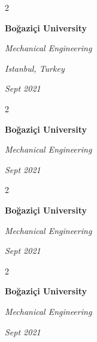 \documentclass[10pt, letterpaper]{article}
\newenvironment{twocolentry}[2][]{
    \onecolentry
    \def\secondColumn{#2}
    \setcolumnwidth{\fill, 4.5 cm}
    \begin{paracol}{2}
}{
    \switchcolumn \raggedleft \secondColumn
    \end{paracol}
    \endonecolentry
} %
\begin{document}
        \vspace{0.2 cm}

        \begin{twocolentry}{
        \textit{Istanbul, Turkey}    
            
        \textit{Sept 2021}}
            \textbf{Boğaziçi University}

            \textit{Mechanical Engineering}
        \end{twocolentry}



        \vspace{0.2 cm}

        \begin{twocolentry}{
            
            
        \textit{Sept 2021}}
            \textbf{Boğaziçi University}

            \textit{Mechanical Engineering}
        \end{twocolentry}



        \vspace{0.2 cm}

        \begin{twocolentry}{
            
            
        \textit{Sept 2021}}
            \textbf{Boğaziçi University}

            \textit{Mechanical Engineering}
        \end{twocolentry}



        \vspace{0.2 cm}

        \begin{twocolentry}{
            
            
        \textit{Sept 2021}}
            \textbf{Boğaziçi University}

            \textit{Mechanical Engineering}
        \end{twocolentry}
\end{document}
